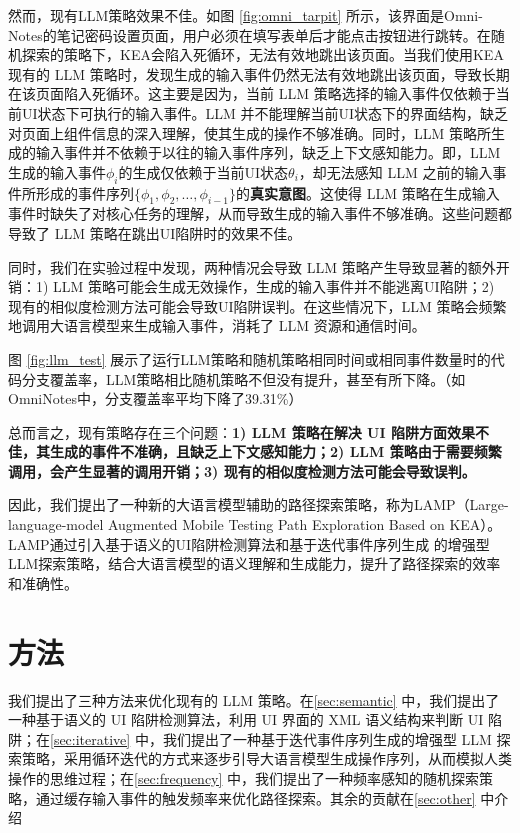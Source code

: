 \documentclass[twocolumn, 10pt]{article}
\newcommand{\kea}{K{\small\MakeUppercase{ea}}}
\newcommand{\lamp}{L{\small\MakeUppercase{amp}}}
\begin{document}
然而，现有LLM策略效果不佳。如图 \ref{fig:omni_tarpit} 所示，该界面是Omni-Notes的笔记密码设置页面，用户必须在填写表单后才能点击按钮进行跳转。在随机探索的策略下，\kea 会陷入死循环，无法有效地跳出该页面。当我们使用\kea 现有的 LLM 策略时，发现生成的输入事件仍然无法有效地跳出该页面，导致长期在该页面陷入死循环。这主要是因为，当前 LLM 策略选择的输入事件仅依赖于当前UI状态下可执行的输入事件。LLM 并不能理解当前UI状态下的界面结构，缺乏对页面上组件信息的深入理解，使其生成的操作不够准确。同时，LLM 策略所生成的输入事件并不依赖于以往的输入事件序列，缺乏上下文感知能力。即，LLM 生成的输入事件$\phi_i$的生成仅依赖于当前UI状态$\theta_i$，却无法感知 LLM 之前的输入事件所形成的事件序列$\{\phi_1, \phi_2, \ldots, \phi_{i-1}\}$的\textbf{真实意图}。这使得 LLM 策略在生成输入事件时缺失了对核心任务的理解，从而导致生成的输入事件不够准确。这些问题都导致了 LLM 策略在跳出UI陷阱时的效果不佳。

同时，我们在实验过程中发现，两种情况会导致 LLM 策略产生导致显著的额外开销：1) LLM 策略可能会生成无效操作，生成的输入事件并不能逃离UI陷阱；2) 现有的相似度检测方法可能会导致UI陷阱误判。在这些情况下，LLM 策略会频繁地调用大语言模型来生成输入事件，消耗了 LLM 资源和通信时间。

图 \ref{fig:llm_test} 展示了运行LLM策略和随机策略相同时间或相同事件数量时的代码分支覆盖率，LLM策略相比随机策略不但没有提升，甚至有所下降。（如OmniNotes中，分支覆盖率平均下降了39.31\%）

总而言之，现有策略存在三个问题：\textbf{1) LLM 策略在解决 UI 陷阱方面效果不佳，其生成的事件不准确，且缺乏上下文感知能力；2) LLM 策略由于需要频繁调用，会产生显著的调用开销；3) 现有的相似度检测方法可能会导致误判。}

因此，我们提出了一种新的大语言模型辅助的路径探索策略，称为\lamp（Large-language-model Augmented Mobile Testing Path Exploration Based on \kea）。\lamp 通过引入基于语义的UI陷阱检测算法和基于迭代事件序列生成 的增强型LLM探索策略，结合大语言模型的语义理解和生成能力，提升了路径探索的效率和准确性。

\section{方法}

我们提出了三种方法来优化现有的 LLM 策略。在\textsection\ref{sec:semantic} 中，我们提出了一种基于语义的 UI 陷阱检测算法，利用 UI 界面的 XML 语义结构来判断 UI 陷阱；在\textsection\ref{sec:iterative} 中，我们提出了一种基于迭代事件序列生成的增强型 LLM 探索策略，采用循环迭代的方式来逐步引导大语言模型生成操作序列，从而模拟人类操作的思维过程；在\textsection\ref{sec:frequency} 中，我们提出了一种频率感知的随机探索策略，通过缓存输入事件的触发频率来优化路径探索。其余的贡献在\textsection\ref{sec:other} 中介绍
\end{document}
